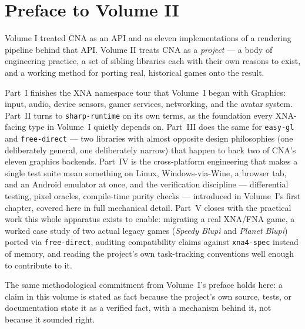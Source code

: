 \chapter*{Preface to Volume II}

Volume I treated CNA as an API and as eleven implementations of a rendering pipeline behind
that API. Volume II treats CNA as a \emph{project} --- a body of engineering practice, a set
of sibling libraries each with their own reasons to exist, and a working method for porting
real, historical games onto the result.

Part~I finishes the XNA namespace tour that Volume~I began with Graphics: input, audio,
device sensors, gamer services, networking, and the avatar system. Part~II turns to
\texttt{sharp-runtime} on its own terms, as the foundation every XNA-facing type in Volume~I
quietly depends on. Part~III does the same for \texttt{easy-gl} and \texttt{free-direct} ---
two libraries with almost opposite design philosophies (one deliberately general, one
deliberately narrow) that happen to back two of CNA's eleven graphics backends. Part~IV is
the cross-platform engineering that makes a single test suite mean something on Linux,
Windows-via-Wine, a browser tab, and an Android emulator at once, and the verification
discipline --- differential testing, pixel oracles, compile-time purity checks --- introduced
in Volume~I's first chapter, covered here in full mechanical detail. Part~V closes with the
practical work this whole apparatus exists to enable: migrating a real XNA/FNA game, a worked
case study of two actual legacy games (\emph{Speedy Blupi} and \emph{Planet Blupi}) ported via
\texttt{free-direct}, auditing compatibility claims against \texttt{xna4-spec} instead of
memory, and reading the project's own task-tracking conventions well enough to contribute to
it.

The same methodological commitment from Volume~I's preface holds here: a claim in this
volume is stated as fact because the project's own source, tests, or documentation state it
as a verified fact, with a mechanism behind it, not because it sounded right.
